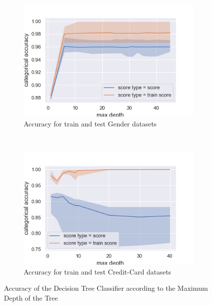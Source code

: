 \documentclass[10pt]{article}
\begin{document}
		\paragraph*{}
			\begin{figure}[h]
				\centering
				\begin{subfigure}[]{0.45\columnwidth}
					\centering
					\includegraphics[width=\linewidth]{../graphics/tree_gender_max_depth_score_type_score_type.png}
					\caption{Accuracy for train and test Gender datasets}
					\label{tree:gender_train_vs_test}
				\end{subfigure}
				~
				\begin{subfigure}[]{0.45\columnwidth}
					\centering
					\includegraphics[width=\linewidth]{../graphics/tree_creditcard_max_depth_score_type_score_type.png}
					\caption{Accuracy for train and test Credit-Card datasets}
					\label{tree:creditcard_train_vs_test}
				\end{subfigure}
				\caption{Accuracy of the Decision Tree Classifier according to the Maximum Depth of the Tree}
				\label{tree:train_vs_test}
			\end{figure}
\end{document}
